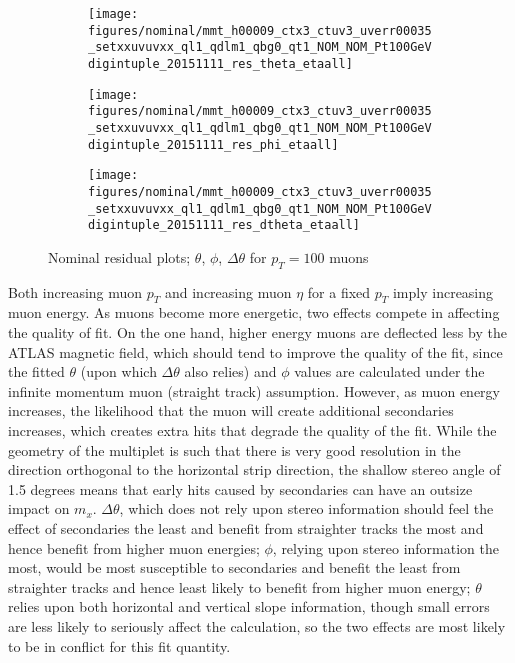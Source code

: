 \begin{figure}[!htbp]\captionsetup{justification=centering}\captionsetup{justification=centering}
  \begin{center}
  \begin{subfigure}{0.3\textwidth}\texttt{[image: figures/nominal/mmt\_h00009\_ctx3\_ctuv3\_uverr00035\_setxxuvuvxx\_ql1\_qdlm1\_qbg0\_qt1\_NOM\_NOM\_Pt100GeVdigintuple\_20151111\_res\_theta\_etaall]}\end{subfigure}
  \begin{subfigure}{0.3\textwidth}\texttt{[image: figures/nominal/mmt\_h00009\_ctx3\_ctuv3\_uverr00035\_setxxuvuvxx\_ql1\_qdlm1\_qbg0\_qt1\_NOM\_NOM\_Pt100GeVdigintuple\_20151111\_res\_phi\_etaall]}\end{subfigure}
  \begin{subfigure}{0.3\textwidth}\texttt{[image: figures/nominal/mmt\_h00009\_ctx3\_ctuv3\_uverr00035\_setxxuvuvxx\_ql1\_qdlm1\_qbg0\_qt1\_NOM\_NOM\_Pt100GeVdigintuple\_20151111\_res\_dtheta\_etaall]}\end{subfigure}
  \caption{\label{fig:nomperf}Nominal residual plots; $\theta$, $\phi$, $\Delta\theta$ for $p_T=100$ \GeV muons}
  \end{center}
\end{figure}

Both increasing muon $p_T$ and increasing muon $\eta$ for a fixed $p_T$ imply increasing muon energy.  As muons become more energetic, two effects compete in affecting the quality of fit.  On the one hand, higher energy muons are deflected less by the ATLAS magnetic field, which should tend to improve the quality of the fit, since the fitted $\theta$ (upon which $\Delta\theta$ also relies) and $\phi$ values are calculated under the infinite momentum muon (straight track) assumption.  However, as muon energy increases, the likelihood that the muon will create additional secondaries increases, which creates extra hits that degrade the quality of the fit.  While the geometry of the multiplet is such that there is very good resolution in the direction orthogonal to the horizontal strip direction, the shallow stereo angle of 1.5 degrees means that early hits caused by secondaries can have an outsize impact on $m_x$.  $\Delta\theta$, which does not rely upon stereo information should feel the effect of secondaries the least and benefit from straighter tracks the most and hence benefit from higher muon energies; $\phi$, relying upon stereo information the most, would be most susceptible to secondaries and benefit the least from straighter tracks and hence least likely to benefit from higher muon energy; $\theta$ relies upon both horizontal and vertical slope information, though small errors are less likely to seriously affect the calculation, so the two effects are most likely to be in conflict for this fit quantity.  

